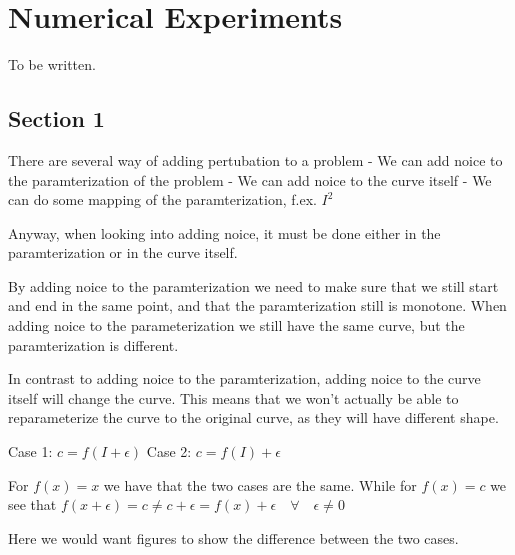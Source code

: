 \chapter{Numerical Experiments}   
\label{chap:numerical-experiments}

To be written.

\section{Section 1}
\label{sec:dyn-sec-1}

There are several way of adding pertubation to a problem 
- We can add noice to the paramterization of the problem 
- We can add noice to the curve itself 
- We can do some mapping of the paramterization, f.ex. \(I^2\)

Anyway, when looking into adding noice, it must be done either in the paramterization or in the curve itself. 

By adding noice to the paramterization we need to make sure that we still start and end in the same point, and that the paramterization still is monotone. When adding noice to the parameterization we still have the same curve, but the paramterization is different.

In contrast to adding noice to the paramterization, adding noice to the curve itself will change the curve. This means that we won't actually be able to reparameterize the curve to the original curve, as they will have different shape. 

Case 1: \(c = f(I + \epsilon) \)
Case 2: \(c = f(I) + \epsilon \)

For \(f(x) = x \) we have that the two cases are the same. 
While for \(f(x) = c \) we see that \(f(x + \epsilon) = c \neq c + \epsilon = f(x) + \epsilon \quad \forall \quad \epsilon \neq 0\)

Here we would want figures to show the difference between the two cases.


